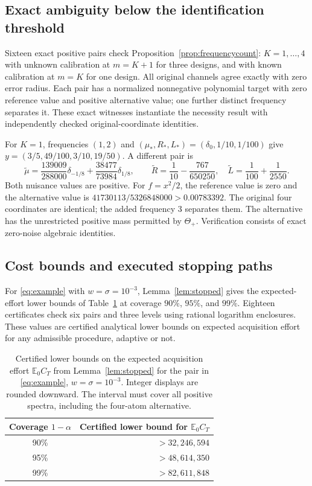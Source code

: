 \documentclass[10pt]{amsart}
\theoremstyle{definition}
\theoremstyle{remark}
\theoremstyle{plain}
\newcommand{\E}{\mathbb E}
\newcommand{\ThetaAll}{\Theta_+}
\begin{document}
\subsection{Exact ambiguity below the identification threshold}
Sixteen exact positive pairs check Proposition~\ref{prop:frequencycount}: $K=1,\ldots,4$ with unknown calibration at $m=K+1$ for three designs, and with known calibration at $m=K$ for one design. All original channels agree exactly with zero error radius. Each pair has a normalized nonnegative polynomial target with zero reference value and positive alternative value; one further distinct frequency separates it. These exact witnesses instantiate the necessity result with independently checked original-coordinate identities.

For $K=1$, frequencies $(1,2)$ and $(\mu_*,R_*,L_*)=(\delta_0,1/10,1/100)$ give $y=(3/5,49/100,3/10,19/50)$. A different pair is
\[
 \widetilde\mu=\frac{139009}{288000}\delta_{-1/8}
       +\frac{38477}{73984}\delta_{1/8},\qquad
 \widetilde R=\frac1{10}-\frac{767}{650250},\quad
 \widetilde L=\frac1{100}+\frac1{2550}.
\]
Both nuisance values are positive. For $f=x^2/2$, the reference value is zero and the alternative value is $41730113/5326848000>0.00783392$. The original four coordinates are identical; the added frequency $3$ separates them. The alternative has the unrestricted positive mass permitted by $\ThetaAll$. Verification consists of exact zero-noise algebraic identities.

\subsection{Cost bounds and executed stopping paths}
For \eqref{eq:example} with $w=\sigma=10^{-3}$, Lemma~\ref{lem:stopped} gives the expected-effort lower bounds of Table~\ref{tab:cost} at coverage $90\%$, $95\%$, and $99\%$. Eighteen certificates check six pairs and three levels using rational logarithm enclosures. These values are certified analytical lower bounds on expected acquisition effort for any admissible procedure, adaptive or not.

\begin{table}[tb]
\centering
\caption{Certified lower bounds on the expected acquisition effort $\E_0C_T$ from Lemma~\ref{lem:stopped} for the pair in \eqref{eq:example}, $w=\sigma=10^{-3}$. Integer displays are rounded downward. The interval must cover all positive spectra, including the four-atom alternative.}\label{tab:cost}
\begin{tabular}{cr}\toprule
Coverage $1-\alpha$ & Certified lower bound for $\E_0 C_T$\\\midrule
90\% & $>32{,}246{,}594$\\
95\% & $>48{,}614{,}350$\\
99\% & $>82{,}611{,}848$\\
\bottomrule\end{tabular}
\end{table}
\end{document}
